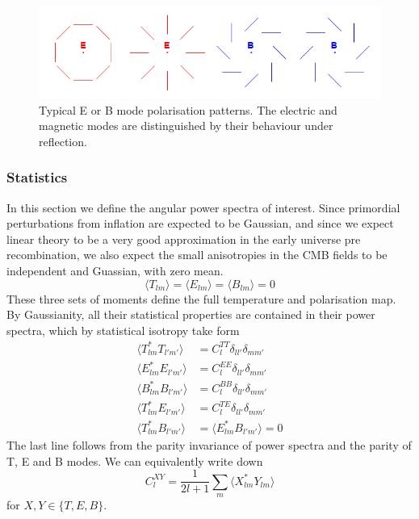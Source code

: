 \documentclass[a4paper,10pt]{article}
\begin{document}
\begin{figure}[h]
  \includegraphics[width=\linewidth]{EBpicture.png}
  \caption{Typical E or B mode polarisation patterns. The electric and magnetic modes are distinguished by their behaviour under reflection.}
\end{figure}

\subsubsection{Statistics}

In this section we define the angular power spectra of interest. Since primordial perturbations from inflation are expected to be Gaussian, and since we expect linear theory to be a very good approximation in the early universe pre recombination, we also expect the small anisotropies in the CMB fields to be independent and Guassian, with zero mean. 
\begin{equation}
\langle T_{lm} \rangle = \langle E_{lm} \rangle = \langle B_{lm} \rangle = 0
\end{equation}
These three sets of moments define the full temperature and polarisation map. By Gaussianity, all their statistical properties are contained in their power spectra, which by statistical isotropy take form
\begin{equation}\begin{split}
\langle T_{lm}^*T_{l'm'} \rangle &= C^{TT}_l\delta_{ll'}\delta_{mm'}\\
\langle E_{lm}^*E_{l'm'} \rangle &= C^{EE}_l\delta_{ll'}\delta_{mm'}\\
\langle B_{lm}^*B_{l'm'} \rangle &= C^{BB}_l\delta_{ll'}\delta_{mm'}\\
\langle T_{lm}^*E_{l'm'} \rangle &= C^{TE}_l\delta_{ll'}\delta_{mm'}\\
\langle T_{lm}^*B_{l'm'} \rangle &= \langle E_{lm}^*B_{l'm'} \rangle = 0
\end{split}\end{equation}
The last line follows from the parity invariance of power spectra and the parity of T, E and B modes. We can equivalently write down
\begin{equation}
C_l^{XY} = \frac{1}{2l+1}\sum_m \langle X_{lm}^*Y_{lm}\rangle
\label{powerspectra}
\end{equation}
for $X,Y \in \{T, E,B\}$. 
\end{document}
